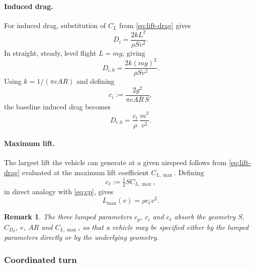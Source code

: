 \documentclass[11pt,a4paper]{article}
\newtheorem{remark}{Remark}
\begin{document}
\paragraph{Induced drag.}
For induced drag, substitution of $C_L$ from \cref{eq:lift-drag} gives
\begin{equation}
  D_i = \frac{2kL^{2}}{\rho S v^{2}} .
\end{equation}
In straight, steady, level flight $L = mg$, giving
\begin{equation}
  D_{i,0} = \frac{2k(mg)^{2}}{\rho S v^{2}} .
\end{equation}
Using $k = 1/(\pi e A\!R)$ and defining
\begin{equation}
  c_i := \frac{2g^{2}}{\pi e A\!R\, S},
  \label{eq:ci}
\end{equation}
the baseline induced drag becomes
\begin{equation}
  D_{i,0} = \frac{c_i}{\rho}\,\frac{m^{2}}{v^{2}} .
\end{equation}

\paragraph{Maximum lift.}
The largest lift the vehicle can generate at a given airspeed follows from
\cref{eq:lift-drag} evaluated at the maximum lift coefficient $C_{L,\max}$.
Defining
\begin{equation}
  c_\ell := \tfrac{1}{2} S C_{L,\max},
  \label{eq:cl}
\end{equation}
in direct analogy with \cref{eq:cp}, gives
\begin{equation}
  L_{\max}(v) = \rho c_\ell v^{2} .
  \label{eq:lmax}
\end{equation}

\begin{remark}
The three lumped parameters $c_p$, $c_i$ and $c_\ell$ absorb the geometry
$S$, $C_{D_0}$, $e$, $A\!R$ and $C_{L,\max}$, so that a vehicle may be specified
either by the lumped parameters directly or by the underlying geometry.
\end{remark}

\subsubsection{Coordinated turn}
\end{document}
